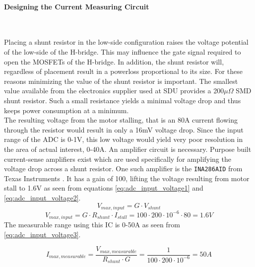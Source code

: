 \paragraph{Designing the Current Measuring Circuit} ~\\%
\label{par:designing_the_current_measuring_circuit}

Placing a shunt resistor in the low-side configuration raises the voltage potential of the low-side of the H-bridge.
This may influence the gate signal required to open the MOSFETs of the H-bridge.
In addition, the shunt resistor will, regardless of placement result in a powerloss proportional to its size.
For these reasons minimizing the value of the shunt resistor is important. 
The smallest value available from the electronics supplier used at SDU provides a 200$\mu\Omega$ SMD shunt resistor.
Such a small resistance yields a minimal voltage drop and thus keeps power consumption at a minimum.\\
The resulting voltage from the motor stalling, that is an 80A current flowing through the resistor would result in only a 16mV voltage drop.
Since the input range of the ADC is 0-1V, this low voltage would yield very poor resolution in the area of actual interest, 0-40A.
An amplifier circuit is necessary.
Purpose built current-sense amplifiers exist which are used specifically for amplifying the voltage drop across a shunt resistor.
One such amplifier is the \texttt{INA286AID} from Texas Instruments \cite{INA286AID}.
It has a gain of 100, lifting the voltage resulting from motor stall to 1.6V as seen from equations \ref{eq:adc_input_voltage1} and \ref{eq:adc_input_voltage2}.
\begin{equation}
	V_{max,input} = G \cdot V_{shunt}
	\label{eq:adc_input_voltage1}
\end{equation}
\begin{equation}
	V_{max,input} = G \cdot R_{shunt} \cdot I_{stall} = 100 \cdot 200\cdot10^{-6} \cdot 80 = 1.6V
	\label{eq:adc_input_voltage2}
\end{equation}
The measurable range using this IC is 0-50A as seen from \ref{eq:adc_input_voltage3}.

\begin{equation}
	I_{max, measurable} = \frac{V_{max, measurable}}{R_{shunt}\cdot G} = \frac{1}{100 \cdot 200\cdot10^{-6} } = 50A
	\label{eq:adc_input_voltage3}
\end{equation}

